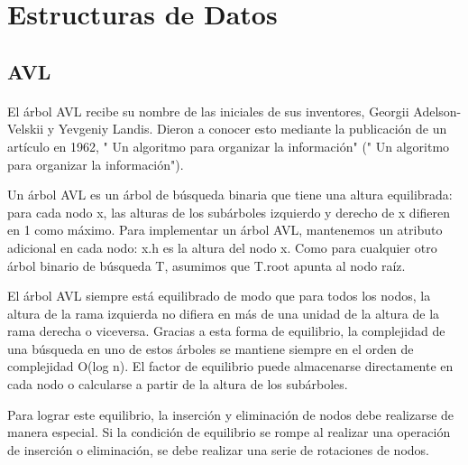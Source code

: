 \documentclass{article}
\begin{document}
	\section{Estructuras de Datos}
   \subsection{AVL}
        \paragraph{}
        El árbol AVL recibe su nombre de las iniciales  de sus inventores, Georgii Adelson-Velskii y Yevgeniy Landis. Dieron a conocer esto mediante la publicación de un artículo en 1962, " Un algoritmo para organizar la información" (" Un algoritmo para organizar la información").

        Un árbol AVL es un árbol de búsqueda binaria que tiene una altura equilibrada: para cada nodo x, las alturas de los subárboles izquierdo y derecho de x difieren en 1 como máximo. Para implementar un árbol AVL, mantenemos un atributo adicional en cada nodo: x.h es la altura del nodo x. Como para cualquier otro árbol binario de búsqueda T, asumimos que T.root apunta al nodo raíz.

        El árbol AVL siempre está equilibrado de  modo que para todos los nodos, la altura de la rama izquierda no difiera en más de una unidad de la altura de la rama derecha o viceversa. Gracias a esta forma de equilibrio, la complejidad de una búsqueda en uno de estos árboles se mantiene siempre en el orden de complejidad O(log n). El factor de equilibrio puede almacenarse directamente en cada nodo o calcularse a partir de la altura de los subárboles.

        Para lograr este equilibrio, la inserción y eliminación de  nodos debe realizarse de manera especial. Si la condición de equilibrio se rompe al realizar una operación de inserción o eliminación, se debe realizar una serie de rotaciones de  nodos.
\end{document}
